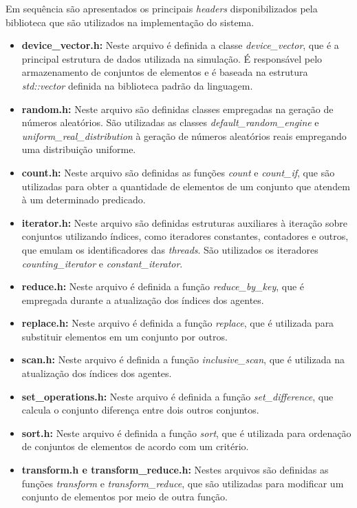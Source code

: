 Em sequência são apresentados os principais \textit{headers} disponibilizados pela biblioteca que são utilizados na implementação do sistema. 

\begin{itemize}
 \item \textbf{device\_vector.h:} Neste arquivo é definida a classe \textit{device\_vector}, que é a principal estrutura de dados utilizada na simulação. É responsável pelo armazenamento de conjuntos de elementos e é baseada na estrutura \textit{std::vector} definida na biblioteca padrão da linguagem. 
 \item \textbf{random.h:} Neste arquivo são definidas classes empregadas na geração de números aleatórios. São utilizadas as classes \textit{default\_random\_engine} e \textit{uniform\_real\_distribution} à geração de números aleatórios reais empregando uma distribuição uniforme. 
 \item \textbf{count.h:} Neste arquivo são definidas as funções \textit{count} e \textit{count\_if}, que são utilizadas para obter a quantidade de elementos de um conjunto que atendem à um determinado predicado. 
 \item \textbf{iterator.h:} Neste arquivo são definidas estruturas auxiliares à iteração sobre conjuntos utilizando índices, como iteradores constantes, contadores e outros, que emulam os identificadores das \textit{threads}. São utilizados os iteradores \textit{counting\_iterator} e \textit{constant\_iterator}. 
 \item \textbf{reduce.h:} Neste arquivo é definida a função \textit{reduce\_by\_key}, que é empregada durante a atualização dos índices dos agentes. 
 \item \textbf{replace.h:} Neste arquivo é definida a função \textit{replace}, que é utilizada para substituir elementos em um conjunto por outros. 
 \item \textbf{scan.h:} Neste arquivo é definida a função \textit{inclusive\_scan}, que é utilizada na atualização dos índices dos agentes. 
 \item \textbf{set\_operations.h:} Neste arquivo é definida a função \textit{set\_difference}, que calcula o conjunto diferença entre dois outros conjuntos. 
 \item \textbf{sort.h:} Neste arquivo é definida a função \textit{sort}, que é utilizada para ordenação de conjuntos de elementos de acordo com um critério. 
 \item \textbf{transform.h e transform\_reduce.h:} Nestes arquivos são definidas as funções \textit{transform} e \textit{transform\_reduce}, que são utilizadas para modificar um conjunto de elementos por meio de outra função. 

\end{itemize}
